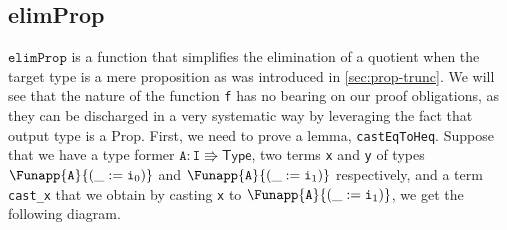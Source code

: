 \documentclass[12pt,twoside,maitrise]{dms}
\theoremstyle{definition}
\numberwithin{equation}{section}
\numberwithin{table}{chapter}
\numberwithin{figure}{chapter}
\newcommand\kw[1] {\textsf{#1}}
\newcommand\id[1] {\texttt{#1}}
\begin{document}
\subsection*{elimProp}
$\id{elimProp}$ is a function that simplifies the elimination of a quotient when
the target type is a mere proposition as was introduced in
\autoref{sec:prop-trunc}. We will see that the nature of the function \id{f} has
no bearing on our proof obligations, as they can be discharged in a very
systematic way by leveraging the fact that output type is a \kw{Prop}. First, we
need to prove a lemma, \id{castEqToHeq}. Suppose that we have a type former
$\id{A} \colon \id{I} \Rrightarrow \kw{Type}$, two terms \id{x} and \id{y} of
types $\Funapp{\id{A}}{(\earg{\_}{\ileft})}$ and
$\Funapp{\id{A}}{(\earg{\_}{\iright})}$ respectively, and a term \id{cast\_x}
that we obtain by casting \id{x} to $\Funapp{\id{A}}{(\earg{\_}{\iright})}$, we
get the following diagram.
\end{document}
